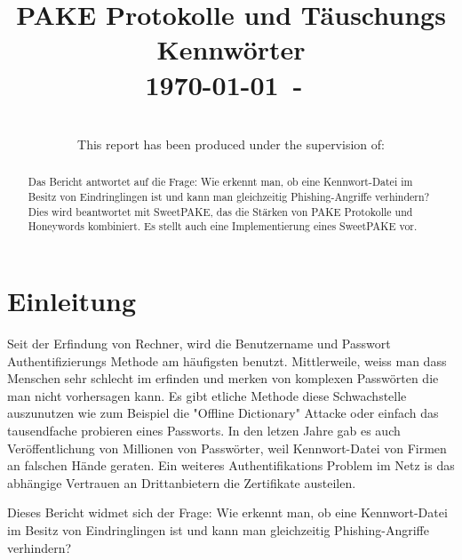 \documentclass[conference, compsoc]{IEEEtran}
\begin{document}
\title{PAKE Protokolle und Täuschungs Kennwörter\\
{\small \today~-~\currenttime}}

\author{
    \\
    This report has been produced under the supervision of:\\
    }

\maketitle

\begin{abstract}
Das Bericht antwortet auf die Frage: Wie erkennt man, ob eine Kennwort-Datei im
	Besitz von Eindringlingen ist und kann man gleichzeitig
	Phishing-Angriffe verhindern?  Dies wird beantwortet mit SweetPAKE, das
	die Stärken von PAKE Protokolle und Honeywords kombiniert. Es stellt
	auch eine Implementierung eines SweetPAKE vor.
\end{abstract}


\section{Einleitung}
Seit der Erfindung von Rechner, wird die Benutzername und Passwort
Authentifizierungs Methode am häufigsten benutzt. Mittlerweile, weiss man dass
Menschen sehr schlecht im erfinden und merken von komplexen Passwörten die man
nicht vorhersagen kann. Es gibt etliche Methode diese Schwachstelle auszunutzen
wie zum Beispiel die "Offline Dictionary" Attacke oder einfach das tausendfache
probieren eines Passworts. In den letzen Jahre gab es auch Veröffentlichung von
Millionen von Passwörter, weil Kennwort-Datei von Firmen an falschen Hände
geraten. Ein weiteres Authentifikations Problem im Netz is das abhängige
Vertrauen an Drittanbietern die Zertifikate austeilen. 

Dieses Bericht widmet sich der Frage: Wie erkennt man, ob eine Kennwort-Datei
im Besitz von Eindringlingen ist und kann man gleichzeitig Phishing-Angriffe
verhindern? 
\end{document}
